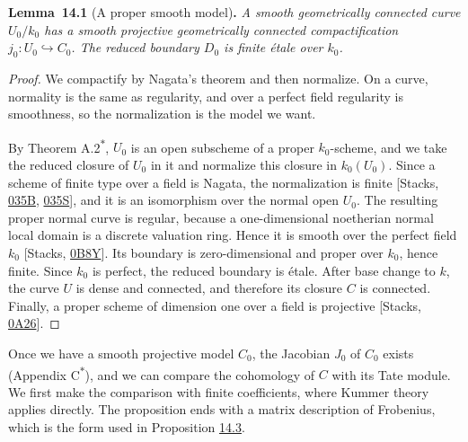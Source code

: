 \documentclass[11pt]{article}
\newenvironment{bpstatement}[2]{\par\addvspace{0.6\baselineskip}\noindent\textbf{#1}#2\textbf{.}\enspace\ignorespaces}
  {\par\addvspace{0.4\baselineskip}}
\newenvironment{bpstatementit}[2]{\begin{bpstatement}{#1}{#2}\itshape\ignorespaces}{\end{bpstatement}}
\newcommand{\bpout}[1]{#1\textsuperscript{\hyperlink{bp-outside}{\ensuremath{\ast}}}}
\begin{document}
\label{bp7}%
\begin{bpstatementit}{Lemma~14.1}{ (A proper smooth model)}
A smooth geometrically connected curve \(U_0/k_0\) has a smooth projective geometrically connected compactification \(j_0:U_0\hookrightarrow C_0\). The reduced boundary \(D_0\) is finite étale over \(k_0\).
\end{bpstatementit}

\begin{proof}[{Proof}]\label{bp8}%
We compactify by Nagata's theorem and then normalize. On a curve, normality is the same as regularity, and over a perfect field regularity is smoothness, so the normalization is the model we want.

By Theorem \bpout{A.2}, \(U_0\) is an open subscheme of a proper \(k_0\)-scheme, and we take the reduced closure of \(U_0\) in it and normalize this closure in \(k_0(U_0)\).  Since a scheme of finite type over a field is Nagata, the normalization is finite [Stacks, \href{https://stacks.math.columbia.edu/tag/035B}{035B}, \href{https://stacks.math.columbia.edu/tag/035S}{035S}], and it is an isomorphism over the normal open \(U_0\).  The resulting proper normal curve is regular, because a one-dimensional noetherian normal local domain is a discrete valuation ring. Hence it is smooth over the perfect field \(k_0\) [Stacks, \href{https://stacks.math.columbia.edu/tag/0B8Y}{0B8Y}].  Its boundary is zero-dimensional and proper over \(k_0\), hence finite. Since \(k_0\) is perfect, the reduced boundary is étale.  After base change to \(k\), the curve \(U\) is dense and connected, and therefore its closure \(C\) is connected.  Finally, a proper scheme of dimension one over a field is projective [Stacks, \href{https://stacks.math.columbia.edu/tag/0A26}{0A26}].
\end{proof}

\label{bp9}%
Once we have a smooth projective model \(C_0\), the Jacobian \(J_0\) of \(C_0\) exists (Appendix \bpout{C}), and we can compare the cohomology of \(C\) with its Tate module. We first make the comparison with finite coefficients, where Kummer theory applies directly. The proposition ends with a matrix description of Frobenius, which is the form used in Proposition \hyperref[bp13]{14.3}.
\end{document}
